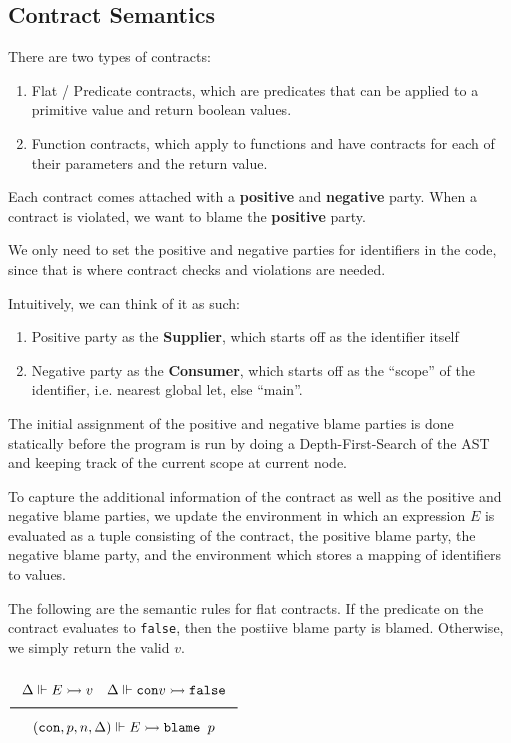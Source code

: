 \documentclass[a4paper]{article}
\newcommand{\Rule}[2]{\genfrac{}{}{0.7pt}{}{{\setlength{\fboxrule}{0pt}\setlength{\fboxsep}{3mm}\fbox{$#1$}}}{{\setlength{\fboxrule}{0pt}\setlength{\fboxsep}{3mm}\fbox{$#2$}}}}
\newcommand{\FalsE}{\texttt{false}}
\newcommand{\eval}{\rightarrowtail}
\newcommand{\under}{\Vdash}
\newcommand{\blame}{\texttt{blame }}
\newcommand{\flatCon}{\texttt{con}}
\begin{document}
\subsection{Contract Semantics}

There are two types of contracts:
\begin{enumerate}
    \item Flat / Predicate contracts, which are predicates that can be applied to a primitive value and return boolean values.
    \item Function contracts, which apply to functions and have contracts for each of their parameters and the return value.
\end{enumerate}

Each contract comes attached with a \textbf{positive} and \textbf{negative} party.
When a contract is violated, we want to blame the \textbf{positive} party.

We only need to set the positive and negative parties for identifiers in the code, since that is where contract checks and violations are needed.

Intuitively, we can think of it as such:
\begin{enumerate}
    \item Positive party as the \textbf{Supplier}, which starts off as the identifier itself
    \item Negative party as the \textbf{Consumer}, which starts off as the “scope” of the identifier, i.e. nearest global let, else “main”.
\end{enumerate}

The initial assignment of the positive and negative blame parties is done statically before the program is run by
doing a Depth-First-Search of the AST and keeping track of the current scope at current node.

To capture the additional information of the contract as well as the positive and negative blame parties,
we update the environment in which an expression $E$ is evaluated as a tuple consisting of the contract,
the positive blame party, the negative blame party, and the environment which stores a mapping of identifiers to values.

The following are the semantic rules for flat contracts. If the predicate on the contract evaluates to \FalsE, then
the postiive blame party is blamed. Otherwise, we simply return the valid $v$.

$\Rule{\Delta \under E \eval v \quad \Delta \under \flatCon v \eval \FalsE}
{(\flatCon, p, n, \Delta) \under E \eval \blame p}$
\end{document}
